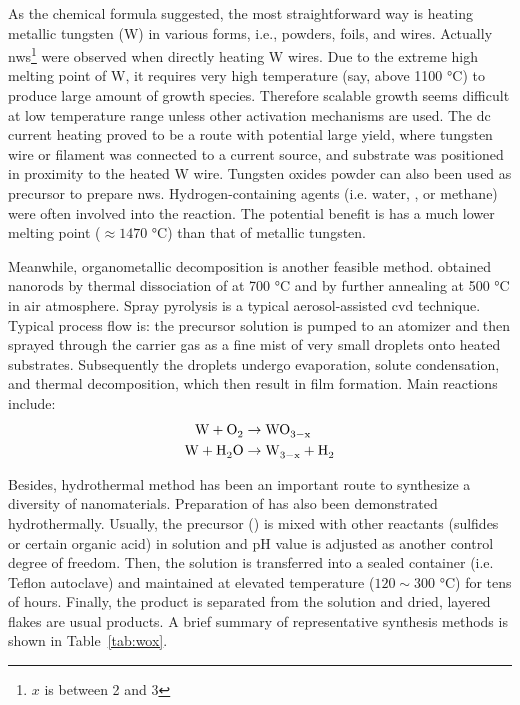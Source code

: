As the chemical formula  suggested, the most straightforward way is heating metallic tungsten (W) in various forms,\cite{Zhou2005a,Cao2009,Hsieh2010} i.e., powders, foils, and wires. Actually  \glspl{nw}\footnote{$x$ is between 2 and 3} were observed when directly heating W wires.\cite{Gu2002a} Due to the extreme high melting point of W, it requires very high temperature (say, above 1100 \si{\degreeCelsius}) to produce large amount of growth species. Therefore scalable growth seems difficult at low temperature range unless other activation mechanisms are used. The dc current heating proved to be a route with potential large yield, where tungsten wire or filament was connected to a current source, and substrate was positioned in proximity to the heated W wire.\cite{Lingfei2006,Thangala2007,Chang2007} Tungsten oxides powder can also been used as precursor to prepare  \glspl{nw}.\cite{Huang2008a,Wang2009} Hydrogen-containing agents (i.e. water, , or methane\cite{Klinke2005}) were often involved into the reaction.\cite{Baek2007,Karuppanan2007} The potential benefit is  has a much lower melting point ($\approx 1470$ \si{\degreeCelsius}) than that of metallic tungsten.

Meanwhile, organometallic decomposition is another feasible method. \citeauthor{Pol2005} obtained  nanorods by thermal dissociation of  at 700 \si{\degreeCelsius} and  by further annealing at 500 \si{\degreeCelsius} in air atmosphere.\cite{Pol2005} Spray pyrolysis is a typical aerosol-assisted \gls{cvd} technique. Typical process flow is: the precursor solution is pumped to an atomizer and then sprayed through the carrier gas as a fine mist of very small droplets onto heated substrates. Subsequently the droplets undergo evaporation, solute condensation, and thermal decomposition, which then result in film formation.\cite{Zheng2011} Main reactions include:
\begin{align}
\cee{W + O2 &\rightarrow WO_{3-x}\\
W + H2O &\rightarrow  W_{3-x} + H2}
\end{align}

Besides, hydrothermal method has been an important route to synthesize a diversity of nanomaterials. Preparation of  has also been demonstrated hydrothermally.\cite{Lee2003,Gu2007} Usually, the precursor () is mixed with other reactants (sulfides or certain organic acid) in solution and pH value is adjusted as another control degree of freedom. Then, the solution is transferred into a sealed container (i.e. Teflon autoclave) and maintained at elevated temperature ($120 \sim 300$ \si{\degreeCelsius}) for tens of hours. Finally, the product is separated from the solution and dried, layered  flakes are usual products. A brief summary of representative synthesis methods is shown in Table~\ref{tab:wox}.


